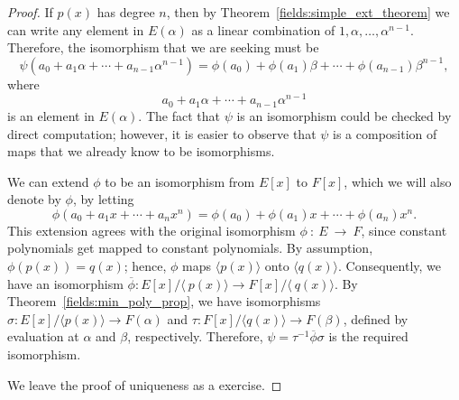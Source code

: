 \medskip


\begin{proof}
If $p(x)$ has degree $n$, then by Theorem~\ref{fields:simple_ext_theorem} we can write any
element in $E( \alpha )$ as a linear combination of $1, \alpha,
\ldots, \alpha^{n-1}$. Therefore, the isomorphism that we are seeking
must be   
\[
\psi( a_0 + a_1 \alpha + \cdots + a_{n-1} \alpha^{n-1})
= \phi(a_0) + \phi(a_1) \beta + \cdots + \phi(a_{n-1}) \beta^{n-1}, 
\]
where 
\[
a_0 + a_1 \alpha + \cdots + a_{n-1} \alpha^{n-1}
\]
is an
element in $E(\alpha)$. The fact that $\psi$ is an isomorphism could
be checked by direct computation; however, it is easier to observe
that $\psi$ is a composition of maps that we already know to be 
isomorphisms.   

We can extend $\phi$ to be an isomorphism from $E[x]$ to $F[x]$, which
we will also denote by $\phi$, by letting
\[
\phi( a_0 + a_1 x + \cdots + a_n x^n )
= 
\phi( a_0 ) + \phi(a_1) x + \cdots + \phi(a_n) x^n.
\]
This extension agrees with the original isomorphism
$\phi~:~E~\rightarrow~F$, since constant polynomials get mapped to
constant polynomials.  By assumption, $\phi(p(x)) = q(x)$; hence,
$\phi$ maps $\langle p(x) \rangle$ onto $\langle q(x) \rangle$.
Consequently, we have an isomorphism
\mbox{$\overline{\phi} : E[x] / \langle~p(x) \rangle \rightarrow
F[x]/\langle~q(x) \rangle$}. By Theorem~\ref{fields:min_poly_prop}, we have 
isomorphisms
\mbox{$\sigma: E[x]/\langle p(x) \rangle \rightarrow F(\alpha)$} and
\mbox{$\tau : F[x]/\langle q(x) \rangle \rightarrow F( \beta )$},
defined by evaluation at $\alpha$ and $\beta$, respectively.
Therefore, $\psi = \tau^{-1} \overline{\phi} \sigma$ is the required
isomorphism.

\begin{center}
\end{center}

We leave the proof of uniqueness as a exercise.
\end{proof}

